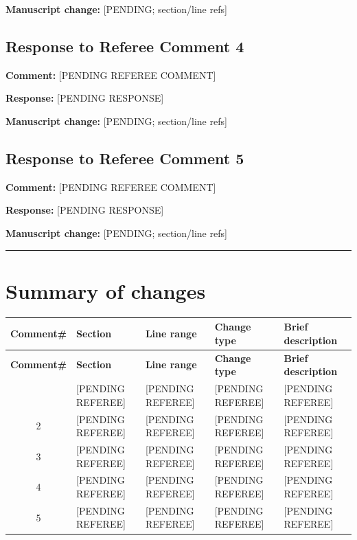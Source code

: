 \documentclass[11pt]{amsart}
\begin{document}
\noindent\textbf{Manuscript change:} [PENDING; section/line refs]

\bigskip

\subsection*{Response to Referee Comment 4}
\textbf{Comment:} [PENDING REFEREE COMMENT]

\medskip

\noindent\textbf{Response:} [PENDING RESPONSE]

\medskip

\noindent\textbf{Manuscript change:} [PENDING; section/line refs]

\bigskip

\subsection*{Response to Referee Comment 5}
\textbf{Comment:} [PENDING REFEREE COMMENT]

\medskip

\noindent\textbf{Response:} [PENDING RESPONSE]

\medskip

\noindent\textbf{Manuscript change:} [PENDING; section/line refs]

\bigskip
\hrule
\bigskip

\section*{Summary of changes}

\begin{longtable}{@{}c l l l p{}@{}}
\toprule
\textbf{Comment\#} & \textbf{Section} & \textbf{Line range} &
\textbf{Change type} & \textbf{Brief description} \\
\midrule
\endfirsthead
\toprule
\textbf{Comment\#} & \textbf{Section} & \textbf{Line range} &
\textbf{Change type} & \textbf{Brief description} \\
\midrule
\endhead
\bottomrule
\endlastfoot
1 & [PENDING REFEREE] & [PENDING REFEREE] & [PENDING REFEREE] &
[PENDING REFEREE] \\
2 & [PENDING REFEREE] & [PENDING REFEREE] & [PENDING REFEREE] &
[PENDING REFEREE] \\
3 & [PENDING REFEREE] & [PENDING REFEREE] & [PENDING REFEREE] &
[PENDING REFEREE] \\
4 & [PENDING REFEREE] & [PENDING REFEREE] & [PENDING REFEREE] &
[PENDING REFEREE] \\
5 & [PENDING REFEREE] & [PENDING REFEREE] & [PENDING REFEREE] &
[PENDING REFEREE] \\
\end{longtable}
\end{document}
